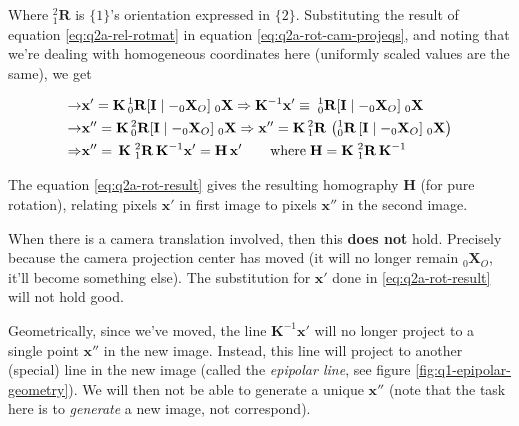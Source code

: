 Where $^2_1\mathbf{R}$ is $\{1\}$'s orientation expressed in $\{2\}$. Substituting the result of equation \ref{eq:q2a-rel-rotmat} in equation \ref{eq:q2a-rot-cam-projeqs}, and noting that we're dealing with homogeneous coordinates here (uniformly scaled values are the same), we get

\begin{align}
    \rightarrow& \mathbf{x}' = \mathbf{K} \, ^1_0\mathbf{R} [ \mathbf{I} \mid - _0\mathbf{X}_O ] \; _0\mathbf{X}
    \Rightarrow \mathbf{K}^{-1} \mathbf{x}' \equiv \; ^1_0\mathbf{R} [ \mathbf{I} \mid - _0\mathbf{X}_O ] \; _0\mathbf{X}
    \nonumber \\
    \rightarrow& \mathbf{x}'' = \mathbf{K} \, ^2_0\mathbf{R} [ \mathbf{I} \mid - _0\mathbf{X}_O ] \; _0\mathbf{X}
    \Rightarrow \mathbf{x}'' = \mathbf{K} \, ^2_1\mathbf{R} \, \left ( ^1_0\mathbf{R} \, [ \mathbf{I} \mid - _0\mathbf{X}_O ] \; _0\mathbf{X} \right )
    \nonumber \\
    \Rightarrow& \mathbf{x}'' = \, \mathbf{K} \; ^2_1\mathbf{R} \, \mathbf{K}^{-1} \mathbf{x}' = \mathbf{H} \, \mathbf{x}'
    \qquad \textup{where} \; \mathbf{H} = \mathbf{K} \; ^2_1\mathbf{R} \, \mathbf{K}^{-1}
    \label{eq:q2a-rot-result}
\end{align}

The equation \ref{eq:q2a-rot-result} gives the resulting homography $\mathbf{H}$ (for pure rotation), relating pixels $\mathbf{x}'$ in first image to pixels $\mathbf{x}''$ in the second image.

When there is a camera translation involved, then this \textbf{does not} hold. Precisely because the camera projection center has moved (it will no longer remain $_0\mathbf{X}_O$, it'll become something else). The substitution for $\mathbf{x}'$ done in \ref{eq:q2a-rot-result} will not hold good.

Geometrically, since we've moved, the line $\mathbf{K}^{-1} \mathbf{x}'$ will no longer project to a single point $\mathbf{x}''$ in the new image. Instead, this line will project to another (special) line in the new image (called the \textit{epipolar line}, see figure \ref{fig:q1-epipolar-geometry}). We will then not be able to generate a unique $\mathbf{x}''$ (note that the task here is to \textit{generate} a new image, not correspond).
